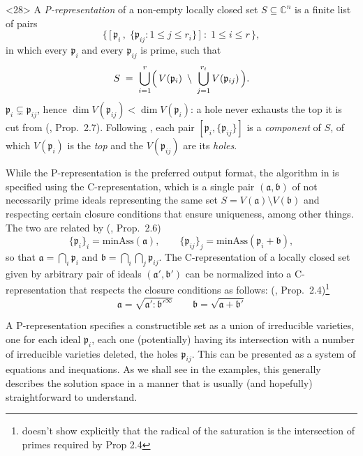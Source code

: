 \documentclass{article}
\theoremstyle{definition}
\theoremstyle{plain}
\begin{document}
\begin{definition}<28>
A {\it P-representation} of a non-empty locally closed set $S \subseteq \mathbb{C}^n$
is a finite list of pairs
\[
\bigl\{\, \bigl[\, \mathfrak{p}_i \,,\; \{ \mathfrak{p}_{ij} : 1 \le j \le r_i \} \,\bigr]
   \;:\; 1 \le i \le r \,\bigr\},
\]
in which every $\mathfrak{p}_i$ and every $\mathfrak{p}_{ij}$ is prime, such that
\[
S \;=\; \bigcup_{i=1}^{r} \Bigl(\, V(\mathfrak{p}_i) \;\setminus\;
        \bigcup_{j=1}^{r_i} V(\mathfrak{p}_{ij}) \,\Bigr).
\]
$\mathfrak{p}_i \subsetneq \mathfrak{p}_{ij}$,
hence $\dim V(\mathfrak{p}_{ij}) < \dim V(\mathfrak{p}_i)$: a hole never
exhausts the top it is cut from (\cite{BrunatMontes}, Prop.~2.7).
Following \cite{BrunatMontes}, each pair $[\mathfrak{p}_i, \{\mathfrak{p}_{ij}\}]$ is a
{\it component} of $S$, of which $V(\mathfrak{p}_i)$ is the {\it top} and the
$V(\mathfrak{p}_{ij})$ are its {\it holes}.

While the P-representation is the preferred output format, the algorithm in \cite{BrunatMontes}
is specified using the C-representation, which is a single pair $(\mathfrak{a}, \mathfrak{b})$
of not necessarily prime ideals representing the same set $S = V(\mathfrak{a}) \setminus V(\mathfrak{b})$
and respecting certain closure conditions that ensure uniqueness, among other things.
The two are related by (\cite{BrunatMontes}, Prop.~2.6)
\[
\{\mathfrak{p}_i\}_i = \mathrm{minAss}(\mathfrak{a}),
\qquad
\{\mathfrak{p}_{ij}\}_j = \mathrm{minAss}(\mathfrak{p}_i + \mathfrak{b}),
\]
so that $\mathfrak{a} = \bigcap_i \mathfrak{p}_i$ and
$\mathfrak{b} = \bigcap_i \bigcap_j \mathfrak{p}_{ij}$.  The C-representation
of a locally closed set given by arbitrary pair of ideals $(\mathfrak{a'}, \mathfrak{b'})$
can be normalized into a C-representation that respects the closure conditions as follows:
(\cite{BrunatMontes}, Prop.~2.4)\footnote{\cite{BrunatMontes} doesn't show explicitly
    that the radical of the saturation is the intersection of primes required by Prop 2.4}
\[
\mathfrak{a} = \sqrt{\mathfrak{a}' : \mathfrak{b}'^\infty}
\qquad
\mathfrak{b} = \sqrt{\mathfrak{a} + \mathfrak{b}'}
\]

\end{definition}

A P-representation specifies a constructible set as a union of irreducible varieties, one for each ideal $\mathfrak{p}_i$,
each one (potentially) having its intersection with a number of irreducible varieties deleted,
the holes $\mathfrak{p}_{ij}$.
This can be presented as a system of equations and inequations.
As we shall see in the examples, this generally describes the solution space
in a manner that is usually (and hopefully) straightforward to understand.
\end{document}
